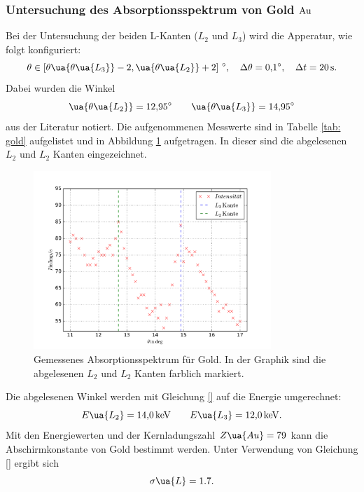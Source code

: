 \subsubsection{Untersuchung des Absorptionsspektrum von Gold $\ce{Au}$}
Bei der Untersuchung der beiden L-Kanten ($L_2$ und $L_3$) wird die Apperatur, wie folgt
konfiguriert:
\begin{equation*}
  \theta\in\left[\theta\ua{\theta\ua{L_3}}-2,\ua{\theta\ua{L_2}}+2\right]\,\si{\degree},\quad \Delta\theta=\SI{0.1}{\degree}, \quad \Delta t=\SI{20}{\second}.
\end{equation*}
Dabei wurden die Winkel
\begin{equation*}
  \ua{\theta\ua{L_2}}=\SI{12.95}{\degree} \qquad  \ua{\theta\ua{L_3}}=\SI{14.95}{\degree}
\end{equation*}
aus der Literatur \cite{} notiert.
Die aufgenommenen Messwerte sind in Tabelle \ref{tab: gold} aufgelistet und in Abbildung
\ref{fig: absotp_gold} aufgetragen. In dieser sind die abgelesenen $L_2$ und $L_2$ Kanten eingezeichnet.

\begin{figure}
  \centering
  \includegraphics[width=0.8\textwidth]{../Messdaten/gold.pdf}
  \caption{Gemessenes Absorptionsspektrum für Gold. In der Graphik sind die abgelesenen $L_2$ und $L_2$ Kanten farblich markiert.} %
  \label{fig: absotp_gold}
\end{figure}
Die abgelesenen Winkel werden mit Gleichung \eqref{} auf die Energie umgerechnet:
\begin{equation}
  \label{eq:l_kanten_gold}
  E\ua{L_2}=\SI{14.0}{\kilo\eV}  \qquad   E\ua{L_3}=\SI{12.0}{\kilo\eV}.
\end{equation}
Mit den Energiewerten und der Kernladungszahl $Z\ua{Au}=79$ kann die Abschirmkonstante
von Gold bestimmt werden. Unter Verwendung von Gleichung \eqref{} ergibt sich
\begin{equation*}
    \sigma\ua{L}=1.7.
\end{equation*}

